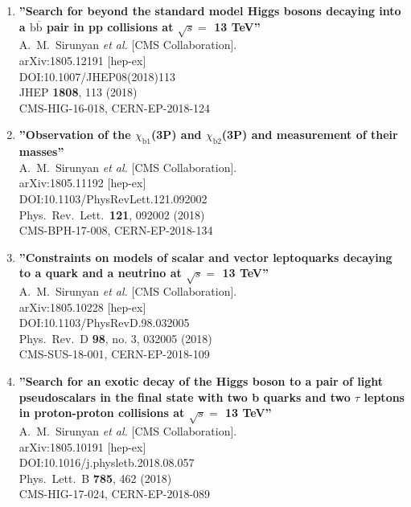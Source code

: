 \begin{enumerate}
\item%
{\bf ''Search for beyond the standard model Higgs bosons decaying into a $\mathrm{b\overline{b}}$ pair in pp collisions at $\sqrt{s} =$ 13 TeV''}
  \\{}A.~M.~Sirunyan {\it et al.} [CMS Collaboration].
  \\{}arXiv:1805.12191 [hep-ex]
  \\{}DOI:10.1007/JHEP08(2018)113
  \\{}JHEP {\bf 1808}, 113 (2018)
  \\{}CMS-HIG-16-018, CERN-EP-2018-124

\item%
{\bf ''Observation of the $\chi_\mathrm{b1}$(3P) and $\chi_\mathrm{b2}$(3P) and measurement of their masses''}
  \\{}A.~M.~Sirunyan {\it et al.} [CMS Collaboration].
  \\{}arXiv:1805.11192 [hep-ex]
  \\{}DOI:10.1103/PhysRevLett.121.092002
  \\{}Phys.\ Rev.\ Lett.\  {\bf 121}, 092002 (2018)
  \\{}CMS-BPH-17-008, CERN-EP-2018-134

\item%
{\bf ''Constraints on models of scalar and vector leptoquarks decaying to a quark and a neutrino at $\sqrt{s}=$ 13 TeV''}
  \\{}A.~M.~Sirunyan {\it et al.} [CMS Collaboration].
  \\{}arXiv:1805.10228 [hep-ex]
  \\{}DOI:10.1103/PhysRevD.98.032005
  \\{}Phys.\ Rev.\ D {\bf 98}, no. 3, 032005 (2018)
  \\{}CMS-SUS-18-001, CERN-EP-2018-109

\item%
{\bf ''Search for an exotic decay of the Higgs boson to a pair of light pseudoscalars in the final state with two b quarks and two $\tau$ leptons in proton-proton collisions at $\sqrt{s}=$ 13 TeV''}
  \\{}A.~M.~Sirunyan {\it et al.} [CMS Collaboration].
  \\{}arXiv:1805.10191 [hep-ex]
  \\{}DOI:10.1016/j.physletb.2018.08.057
  \\{}Phys.\ Lett.\ B {\bf 785}, 462 (2018)
  \\{}CMS-HIG-17-024, CERN-EP-2018-089


\end{enumerate}
